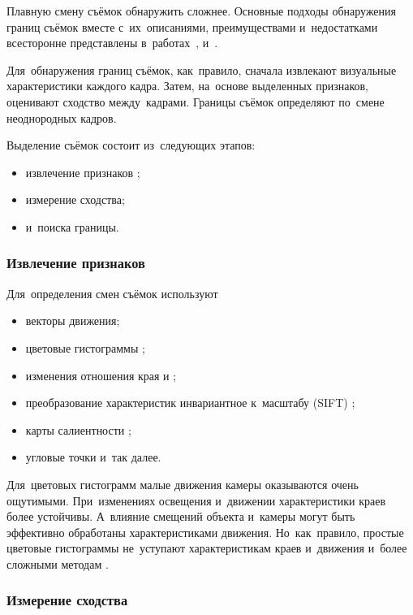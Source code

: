 Плавную смену съёмок обнаружить сложнее.
Основные подходы обнаружения границ съёмок
вместе с~их~описаниями, преимуществами
и~недостатками всесторонне представлены
в~работах~\cite{Smeaton:2010}, \cite{Nigay:1993} и~\cite{Yuan:2007}.

Для~обнаружения границ съёмок, как~правило,
сначала извлекают визуальные характеристики каждого кадра.
Затем, на~основе выделенных признаков, оценивают сходство между~кадрами.
Границы съёмок определяют по~смене неоднородных кадров.

Выделение съёмок состоит из~следующих этапов:
\begin{itemize}
    \item извлечение признаков \cite{Chantamunee:2007};
    \item измерение сходства;
    \item и~поиска границы.
\end{itemize}


\subsubsection{Извлечение признаков}

Для~определения смен съёмок используют
\begin{itemize}
    \item векторы движения;
    \item цветовые гистограммы \cite{Hoi:2006};
    \item изменения отношения края \cite{Yoo:2006} \cite{Zhao:2006} и \cite{Porter:2004};
    \item преобразование характеристик инвариантное к~масштабу (SIFT) \cite{Chang:2008};
    \item карты салиентности \cite{Wu:2008};
    \item угловые точки \cite{Gao:2006} и~так далее.
\end{itemize}

Для~цветовых гистограмм малые движения камеры оказываются очень ощутимыми.
При~изменениях освещения и~движении характеристики краев
более устойчивы. А~влияние смещений объекта
и~камеры могут быть эффективно обработаны характеристиками движения.
Но~как~правило, простые цветовые гистограммы
не~уступают характеристикам краев и~движения
и~более сложными методам \cite{Yuan:2007}.


\subsubsection{Измерение сходства}

